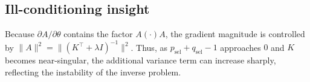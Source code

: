 \documentclass[pdflatex,sn-mathphys-num]{sn-jnl}%
\theoremstyle{thmstyleone}%
\theoremstyle{thmstyletwo}%
\theoremstyle{thmstylethree}%
\begin{document}
\subsection*{Ill-conditioning insight}

Because $\partial A/\partial\theta$ contains the factor $A(\cdot)A$, the gradient magnitude is controlled by
$\|A\|^2=\|(K^\top+\lambda I)^{-1}\|^2$. Thus, as $p_{\mathrm{sel}}+q_{\mathrm{sel}}-1$ approaches $0$ and $K$ becomes
near-singular, the additional variance term can increase sharply, reflecting the instability of the inverse problem.
\end{document}
